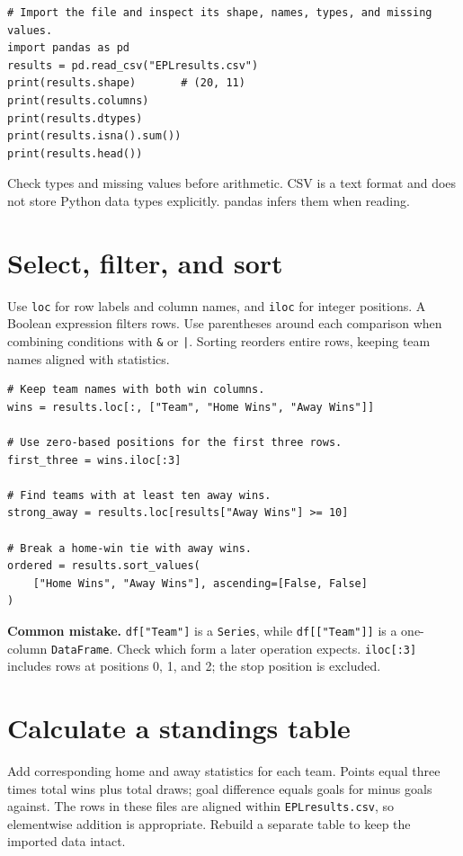 \documentclass[11pt,letterpaper]{article}
\begin{document}
\begin{lstlisting}
# Import the file and inspect its shape, names, types, and missing values.
import pandas as pd
results = pd.read_csv("EPLresults.csv")
print(results.shape)       # (20, 11)
print(results.columns)
print(results.dtypes)
print(results.isna().sum())
print(results.head())
\end{lstlisting}

Check types and missing values before arithmetic. CSV is a text format and does not store Python data types explicitly. pandas infers them when reading.

\section{Select, filter, and sort}
Use \texttt{loc} for row labels and column names, and \texttt{iloc} for integer positions. A Boolean expression filters rows. Use parentheses around each comparison when combining conditions with \texttt{\&} or \texttt{|}. Sorting reorders entire rows, keeping team names aligned with statistics.

\begin{lstlisting}
# Keep team names with both win columns.
wins = results.loc[:, ["Team", "Home Wins", "Away Wins"]]

# Use zero-based positions for the first three rows.
first_three = wins.iloc[:3]

# Find teams with at least ten away wins.
strong_away = results.loc[results["Away Wins"] >= 10]

# Break a home-win tie with away wins.
ordered = results.sort_values(
    ["Home Wins", "Away Wins"], ascending=[False, False]
)
\end{lstlisting}

\noindent \textbf{Common mistake.} \texttt{df["Team"]} is a \texttt{Series}, while \texttt{df[["Team"]]} is a one-column \texttt{DataFrame}. Check which form a later operation expects. \texttt{iloc[:3]} includes rows at positions 0, 1, and 2; the stop position is excluded.

\section{Calculate a standings table}
Add corresponding home and away statistics for each team. Points equal three times total wins plus total draws; goal difference equals goals for minus goals against. The rows in these files are aligned within \texttt{EPLresults.csv}, so elementwise addition is appropriate. Rebuild a separate table to keep the imported data intact.
\end{document}
